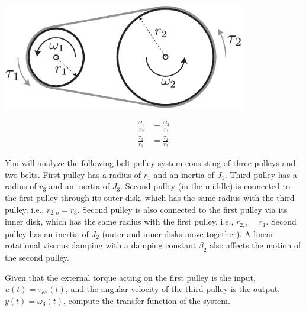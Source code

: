 \documentclass[twoside]{article}
\theoremstyle{definition}
\begin{document}
\begin{minipage}[h]{0.75\linewidth}
    \begin{center}
      \includegraphics[width=0.8\textwidth]{beltpulley}
    \end{center}
\end{minipage}
\begin{minipage}[h]{0.25\linewidth}
    \begin{center}
\begin{align*}
	\frac{\omega_1}{r_2} &= \frac{\omega_2}{r_1}
	\\
	\frac{\tau_1}{r_1} &= \frac{\tau_2}{r_2}
\end{align*}
    \end{center}
\end{minipage}    

\vspace{12pt}

You will analyze the following belt-pulley system consisting of three pulleys and two belts. First pulley 
has a radius of $r_1$ and an inertia of $J_1$. Third pulley has a radius of $r_3$ and an inertia of $J_3$. 
Second pulley (in the middle) is connected to the first pulley through
its outer disk, which has the same radius with the third pulley, i.e.,
$r_{2,o} = r_3$. Second pulley is also connected to the first pulley
via its inner disk, which has the same radius with the first pulley, i.e.,
$r_{2,i} = r_1$. Second pulley has an inertia of $J_2$ (outer and
inner disks move together). A linear rotational viscous damping
with a damping constant $\beta_2$ also affects the motion of the
second pulley. 
	
\vspace{6pt} 
	
Given that the external torque acting on the first pulley is the input, $u(t) = \tau_{ex}(t)$, and the angular velocity of the third pulley
is the output, $y(t) = \omega_3(t)$, compute the transfer function of
the system.

\vspace{12pt}
	
\end{document}

